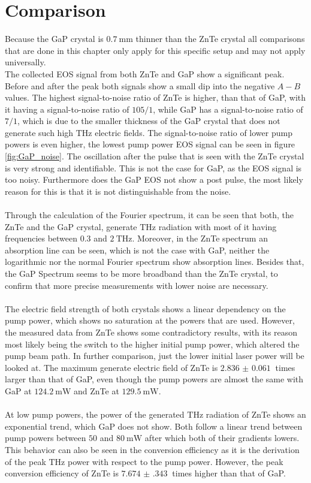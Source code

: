 \section{Comparison}
Because the GaP crystal is $\SI{0.7}{\milli\meter}$ thinner than the ZnTe crystal all comparisons that are done in this chapter only apply for this specific setup and may not apply universally.
\\
The collected EOS signal from both ZnTe and GaP show a significant peak.
Before and after the peak both signals show a small dip into the negative $A-B$ values.
The highest signal-to-noise ratio of ZnTe is higher, than that of GaP, with it having a signal-to-noise ratio of $105/1$, while GaP has a signal-to-noise ratio of $7/1$, which is due to the smaller thickness of the GaP crystal that does not generate such high $\si{\tera\hertz}$ electric fields.
The signal-to-noise ratio of lower pump powers is even higher, the lowest pump power EOS signal can be seen in figure \ref{fig:GaP_noise}.
The oscillation after the pulse that is seen with the ZnTe crystal is very strong and identifiable.
This is not the case for GaP, as the EOS signal is too noisy.
Furthermore does the GaP EOS not show a post pulse, the most likely reason for this is that it is not distinguishable from the noise.
\\\\
Through the calculation of the Fourier spectrum, it can be seen that both, the ZnTe and the GaP crystal, generate $\si{\tera\hertz}$ radiation with most of it having frequencies between $0.3$ and $\SI{2}{\tera\hertz}$.
Moreover, in the ZnTe spectrum an absorption line can be seen, which is not the case with GaP, neither the logarithmic nor the normal Fourier spectrum show absorption lines.
Besides that, the GaP Spectrum seems to be more broadband than the ZnTe crystal, to confirm that more precise measurements with lower noise are necessary.
\\\\
The electric field strength of both crystals shows a linear dependency on the pump power, which shows no saturation at the powers that are used.
However, the measured data from ZnTe shows some contradictory results, with its reason most likely being the switch to the higher initial pump power, which altered the pump beam path.
In further comparison, just the lower initial laser power will be looked at.
The maximum generate electric field of ZnTe is $\SI{2.836(61)}{}$ times larger than that of GaP, even though the pump powers are almost the same with GaP at $\SI{124.2}{\milli\W}$ and ZnTe at $\SI{129.5}{\milli\W}$.
\\\\
At low pump powers, the power of the generated $\si{\tera\hertz}$ radiation of ZnTe shows an exponential trend, which GaP does not show.
Both follow a linear trend between pump powers between $50$ and $\SI{80}{\milli\W}$ after which both of their gradients lowers.
This behavior can also be seen in the conversion efficiency as it is the derivation of the peak $\si{\tera\hertz}$ power with respect to the pump power.
However, the peak conversion efficiency of ZnTe is $\SI{7.674(343)}{}$ times higher than that of GaP. 